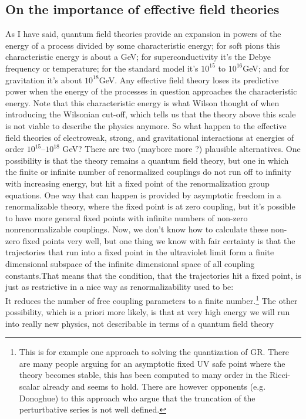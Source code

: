 \subsection{On the importance of effective field theories}
As I have said, quantum field theories provide an expansion in
powers of the energy of a process divided by some characteristic
energy; for soft pions this characteristic energy is about a GeV;
for superconductivity it’s the Debye frequency or temperature;
for the standard model it’s $10^{15}$ to $10^{ 16}$GeV; and for gravitation it’s about $10^{ 18}$GeV. Any effective field theory loses its predictive power when the energy of the processes in question approaches the characteristic energy. Note that this characteristic energy is what Wilson thought of when introducing the Wilsonian cut-off, which tells us that the theory above this scale is not viable to describe the physics anymore. So what happen to the effective field theories of electroweak, strong, and gravitational interactions at energies of order $10^{ 15} – 10^{ 18}$ GeV? There are two (maybore more ?) plausible alternatives. One possibility is that the theory remains a quantum field theory, but one in which the finite or infinite number of renormalized couplings do not run off to infinity with increasing energy, but hit a fixed point of the renormalization group equations. One way that can happen is provided
by asymptotic freedom in a renormalizable theory, where
the fixed point is at zero coupling, but it’s possible to have more
general fixed points with infinite numbers of non-zero nonrenormalizable couplings. Now, we don’t know how to calculate these
non-zero fixed points very well, but one thing we know with fair
certainty is that the trajectories that run into a fixed point in the
ultraviolet limit form a finite dimensional subspace of the infinite dimensional space of all coupling constants.That means that
the condition, that the trajectories hit a fixed point, is just as restrictive in a nice way as renormalizability used to be: \\
It reduces
the number of free coupling parameters to a finite number.\footnote{This is for example one approach to solving the quantization of GR. There are many people arguing for an asymptotic fixed UV safe point where the theory becomes stable, this has been computed to many order in the Ricci-scalar already and seems to hold. There are however opponents (e.g. Donoghue) to this approach who argue that the truncation of the perturtbative series is not well defined.}
 The
other possibility, which is a priori more likely, is
that at very high energy we will run into really new physics, not
describable in terms of a quantum field theory



